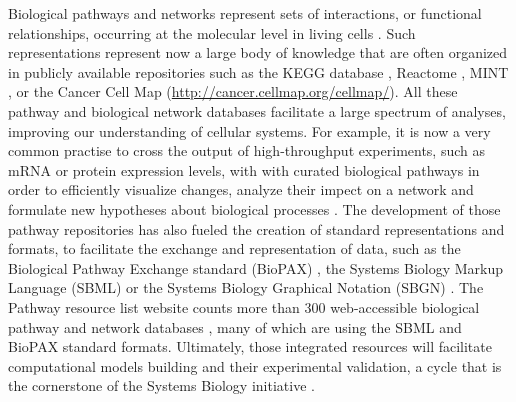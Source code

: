 \documentclass[10pt]{bmc_article}
\newenvironment{bmcformat}{\baselineskip20pt\sloppy\setboolean{publ}{false}}{\baselineskip20pt\sloppy}
\begin{document}
\begin{bmcformat}
Biological pathways and networks represent sets of interactions, or functional
relationships, occurring at the molecular level in living cells
\cite{adriaens2008public, cary2005pathway}. Such representations represent now
a large body of knowledge that are often organized in publicly available
repositories such as the KEGG database \cite{ogata1999kegg}, Reactome
\cite{joshi2005reactome}, MINT \cite{zanzoni2002mint}, or the Cancer Cell Map
(\url{http://cancer.cellmap.org/cellmap/}). All these pathway and biological
network databases facilitate a large spectrum of analyses, improving our
understanding of cellular systems. For example, it is now a very common
practise to cross the output of high-throughput experiments, such as mRNA or
protein expression levels, with with curated biological pathways in
order to efficiently visualize changes, analyze their impect on a network and
formulate new hypotheses about
biological processes \cite{saraiya2005visualizing,
gehlenborg2010visualization}. The development of those pathway repositories has
also fueled the creation of standard representations and formats, to facilitate
the exchange and representation of data, such as the Biological Pathway
Exchange standard (BioPAX) \cite{demir2010biopax}, the Systems Biology Markup
Language (SBML) \cite{hucka2003systems} or the Systems Biology Graphical
Notation (SBGN) \cite{le2009systems}. The Pathway resource list website counts
more than 300 web-accessible biological pathway and network databases
\cite{bader2006pathguide}, many of which are using the SBML and BioPAX standard
formats. Ultimately, those integrated resources will facilitate computational
models building and their experimental validation, a cycle that is the
cornerstone of the Systems Biology initiative \cite{karlebach2008modelling,
kitano2002systems, ideker2001new}.


\end{bmcformat}
\end{document}
